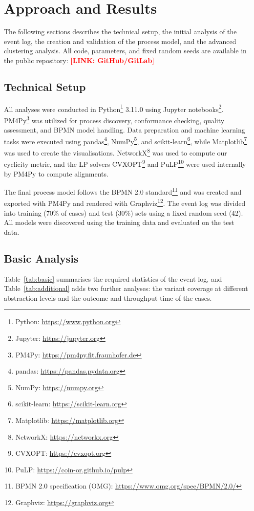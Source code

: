 \documentclass[
  english,        %
  font=times,     %
  twocolumn,      %
]{tumarticle}
\let\oldsubsection\subsection
\renewcommand{\subsection}{\FloatBarrier\oldsubsection}
\newcommand{\fn}[2]{\footnote{\tiny #1: \url{#2}}}
\newcommand{\todo}[1]{\textcolor{red}{\textbf{[#1]}}}
\begin{document}
\section{Approach and Results}
The following sections describes the technical setup, the initial analysis of the event log, the creation and validation of the process model, and the advanced clustering analysis. All code, parameters, and fixed random seeds are available in the public repository:
\todo{LINK: GitHub/GitLab}

\subsection{Technical Setup}
All analyses were conducted in Python\fn{Python}{https://www.python.org} 3.11.0 using Jupyter notebooks\fn{Jupyter}{https://jupyter.org}. PM4Py\fn{PM4Py}{https://pm4py.fit.fraunhofer.de} was utilized for process discovery, conformance checking, quality assessment, and BPMN model handling. Data preparation and machine learning tasks were executed using pandas\fn{pandas}{https://pandas.pydata.org}, NumPy\fn{NumPy}{https://numpy.org}, and scikit-learn\footnote{\tiny scikit-learn: \url{https://scikit-learn.org}\label{fn:sklearn}}, while Matplotlib\fn{Matplotlib}{https://matplotlib.org} was used to create the visualisations. NetworkX\fn{NetworkX}{https://networkx.org} was used to compute our cyclicity metric, and the LP solvers CVXOPT\fn{CVXOPT}{https://cvxopt.org} and PuLP\fn{PuLP}{https://coin-or.github.io/pulp} were used internally by PM4Py to compute alignments.

The final process model follows the BPMN 2.0 standard\fn{BPMN 2.0 specification (OMG)}{https://www.omg.org/spec/BPMN/2.0/} and was created and exported with PM4Py and rendered with Graphviz\fn{Graphviz}{https://graphviz.org}. The event log was divided into training (70\% of cases) and test (30\%) sets using a fixed random seed (42). All models were discovered using the training data and evaluated on the test data.

\subsection{Basic Analysis}
Table~\ref{tab:basic} summarises the required statistics of the event log, and Table~\ref{tab:additional} adds two further analyses: the variant coverage at different abstraction levels and the outcome and throughput time of the cases.

\begin{table}[!htb]
    \caption{Basic event log statistics (full log).}
    \label{tab:basic}
    \centering
    \small
    \setlength{\tabcolsep}{3pt}
    
\end{table}
\end{document}
